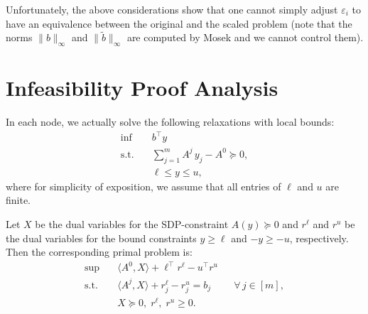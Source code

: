 \documentclass[10pt, a4paper]{article}
\newcommand{\norm}[1]{\lVert{#1}\rVert}
\newcommand{\skal}[2]{\langle{#1},{#2}\rangle}
\newcommand{\T}{^{\top}}
\begin{document}
Unfortunately, the above considerations show that one cannot simply adjust
$\varepsilon_i$ to have an equivalence between the original and the scaled
problem (note that the norms $\norm{b}_{\infty}$ and
$\norm{\tilde{b}}_{\infty}$ are computed by Mosek and we cannot control
them).

\section{Infeasibility Proof Analysis}

In each node, we actually solve the following relaxations with local
bounds:
\begin{equation}\label{SDP-D}
  \begin{aligned}
    \inf \quad & b\T y \\
    \text{s.t.} \quad & \sum_{j=1}^m A^j\, y_j - A^0 \succeq 0, \\
    & \ell \leq y \leq u,
  \end{aligned}
\end{equation}
where for simplicity of exposition, we assume that all entries of $\ell$
and $u$ are finite.

Let $X$ be the dual variables for the SDP-constraint $A(y) \succeq 0$ and
$r^\ell$ and $r^u$ be the dual variables for the bound constraints
$y \geq \ell$ and $-y \geq -u$, respectively. Then the corresponding primal
problem is:
\begin{equation}\label{SDP-P}
  \begin{aligned}
     \sup \quad & \skal{A^0}{X} + \ell\T r^\ell - u\T r^u\\
     \mbox{s.t.} \quad & \skal{A^j}{X} + r^\ell_j - r^u_j = b_j && \forall \, j \in [m],\\
     & X \succeq 0,\; r^\ell,\; r^u \geq 0.
  \end{aligned}
\end{equation}
\end{document}
